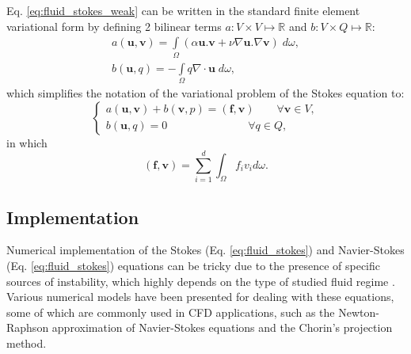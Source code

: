Eq. \ref{eq:fluid_stokes_weak} can be written in the standard finite element variational form by defining 2 bilinear terms $a: V \times V \mapsto \mathbb{R}$ and $b: V \times Q \mapsto \mathbb{R}$:
\begin{equation}
\begin{array}{*{20}{l}}
\displaystyle  {a({\mathbf{u}},{\mathbf{v}}) = \int\limits_\Omega  {(\alpha {\mathbf{u}}.{\mathbf{v}} + \nu\nabla {\mathbf{u}}.\nabla {\mathbf{v}})\;d\omega ,} } \\
\displaystyle  {b({\mathbf{u}},{q}) =  - \int\limits_\Omega  {q\nabla\cdot{\mathbf{u}}\;d\omega ,} }
\end{array}
\end{equation}
which simplifies the notation of the variational problem of the Stokes equation to:
\begin{equation}
\left\{ {\begin{array}{*{20}{l}}
\displaystyle  {a({\mathbf{u}},{\mathbf{v}}) + {b}({\mathbf{v}},p) = ({\mathbf{f}},{\mathbf{v}})\qquad {\forall {\mathbf{v}}} \in V,} \\
\displaystyle  {b({\mathbf{u}},q) = 0\qquad \qquad \qquad \quad \;{\forall q} \in Q,}
\end{array}} \right.
\end{equation}
in which
\begin{equation}
(\mathbf{f}, \mathbf{v})=\sum_{i=1}^{d} \int_{\Omega} f_{i} v_{i} d \omega.
\end{equation}


\subsection{Implementation}

Numerical implementation of the Stokes (Eq. \ref{eq:fluid_stokes}) and Navier-Stokes (Eq. \ref{eq:fluid_stokes}) equations can be tricky due to the presence of specific sources of instability, which highly depends on the type of studied fluid regime \cite{Girault1979, Elman2014}. Various numerical models have been presented for dealing with these equations, some of which are commonly used in \gls{CFD} applications, such as the Newton-Raphson approximation of Navier-Stokes equations and the Chorin's projection method.

